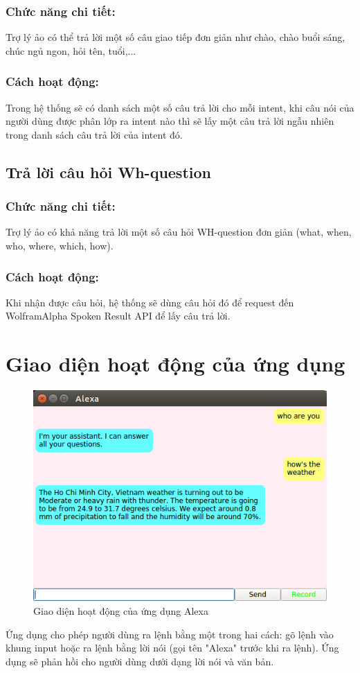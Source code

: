 \subsubsection{Chức năng chi tiết:}

Trợ lý ảo có thể trả lời một số câu giao tiếp đơn giản như chào, chào buổi sáng, chúc ngủ ngon, hỏi tên, tuổi,...

\subsubsection{Cách hoạt động:}

Trong hệ thống sẽ có danh sách một số câu trả lời cho mỗi intent, khi câu nói của người dùng được phân lớp ra intent nào thì sẽ lấy một câu trả lời ngẫu nhiên trong danh sách câu trả lời của intent đó.

\subsection{Trả lời câu hỏi Wh-question}

\subsubsection{Chức năng chi tiết:}

Trợ lý ảo có khả năng trả lời một số câu hỏi WH-question đơn giản (what, when, who, where, which, how).

\subsubsection{Cách hoạt động:}

Khi nhận được câu hỏi, hệ thống sẽ dùng câu hỏi đó để request đến WolframAlpha Spoken Result API để lấy câu trả lời.

\section{Giao diện hoạt động của ứng dụng}

\begin{figure}[h]
    \centering
    \includegraphics[scale=0.7]{interface}
    \caption{Giao diện hoạt động của ứng dụng Alexa}
    \label{fig:c6_interface}
\end{figure}

Ứng dụng cho phép người dùng ra lệnh bằng một trong hai cách: gõ lệnh vào khung input hoặc ra lệnh bằng lời nói (gọi tên "Alexa" trước khi ra lệnh). Ứng dụng sẽ phản hồi cho người dùng dưới dạng lời nói và văn bản.
